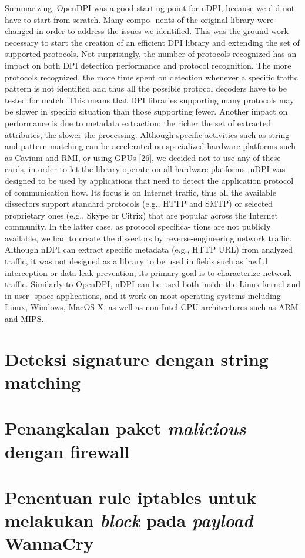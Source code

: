 Summarizing, OpenDPI was a good starting point for nDPI, because we did not have to start from scratch. Many compo- nents of the original library were changed in order to address the issues we identified. This was the ground work necessary to start the creation of an efficient DPI library and extending the set of supported protocols. Not surprisingly, the number of protocols recognized has an impact on both DPI detection performance and protocol recognition. The more protocols recognized, the more time spent on detection whenever a specific traffic pattern is not identified and thus all the possible protocol decoders have to be tested for match. This means that DPI libraries supporting many protocols may be slower in specific situation than those supporting fewer. Another impact on performance is due to metadata extraction: the richer the set of extracted attributes, the slower the processing. Although specific activities such as string and pattern matching can be accelerated on specialized hardware platforms such as Cavium and RMI, or using GPUs [26], we decided not to use any of these cards, in order to let the library operate on all hardware platforms. 
nDPI was designed to be used by applications that need to detect the application protocol of communication flow. Its focus is on Internet traffic, thus all the available dissectors support standard protocols (e.g., HTTP and SMTP) or selected proprietary ones (e.g., Skype or Citrix) that are popular across the Internet community. In the latter case, as protocol specifica- tions are not publicly available, we had to create the dissectors by reverse-engineering network traffic. Although nDPI can extract specific metadata (e.g., HTTP URL) from analyzed traffic, it was not designed as a library to be used in fields such as lawful interception or data leak prevention; its primary goal is to characterize network traffic. Similarly to OpenDPI, nDPI can be used both inside the Linux kernel and in user- space applications, and it work on most operating systems including Linux, Windows, MacOS X, as well as non-Intel CPU architectures such as ARM and MIPS. 


\section{Deteksi signature dengan string matching}


\section{Penangkalan paket \textit{malicious} dengan firewall}


\section{Penentuan rule iptables untuk melakukan \textit{block} pada \textit{payload} WannaCry}



